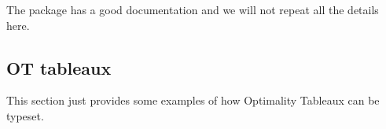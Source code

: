 The package has a good documentation and we will not repeat all the details here.






\subsection{OT tableaux}


This section just provides some examples of how Optimality Tableaux can be typeset.

